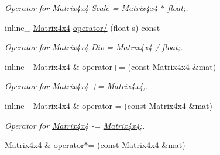 \begin{DoxyCompactItemize}
\begin{DoxyCompactList}\small\item\em Operator for \hyperlink{class_matrix4x4}{Matrix4x4} Scale = \hyperlink{class_matrix4x4}{Matrix4x4} $\ast$ float;. \end{DoxyCompactList}\item 
\hypertarget{class_matrix4x4_a7409459b4e7c25164031148b290ba899}{inline\+\_\+ \hyperlink{class_matrix4x4}{Matrix4x4} \hyperlink{class_matrix4x4_a7409459b4e7c25164031148b290ba899}{operator/} (float s) const }\label{class_matrix4x4_a7409459b4e7c25164031148b290ba899}

\begin{DoxyCompactList}\small\item\em Operator for \hyperlink{class_matrix4x4}{Matrix4x4} Div = \hyperlink{class_matrix4x4}{Matrix4x4} / float;. \end{DoxyCompactList}\item 
\hypertarget{class_matrix4x4_a8646f6d6d1ecfd9d56f2d943056ad80d}{inline\+\_\+ \hyperlink{class_matrix4x4}{Matrix4x4} \& \hyperlink{class_matrix4x4_a8646f6d6d1ecfd9d56f2d943056ad80d}{operator+=} (const \hyperlink{class_matrix4x4}{Matrix4x4} \&mat)}\label{class_matrix4x4_a8646f6d6d1ecfd9d56f2d943056ad80d}

\begin{DoxyCompactList}\small\item\em Operator for \hyperlink{class_matrix4x4}{Matrix4x4} += \hyperlink{class_matrix4x4}{Matrix4x4};. \end{DoxyCompactList}\item 
\hypertarget{class_matrix4x4_a95b6e7baaaa01c70666b11ba30f22dd9}{inline\+\_\+ \hyperlink{class_matrix4x4}{Matrix4x4} \& \hyperlink{class_matrix4x4_a95b6e7baaaa01c70666b11ba30f22dd9}{operator-\/=} (const \hyperlink{class_matrix4x4}{Matrix4x4} \&mat)}\label{class_matrix4x4_a95b6e7baaaa01c70666b11ba30f22dd9}

\begin{DoxyCompactList}\small\item\em Operator for \hyperlink{class_matrix4x4}{Matrix4x4} -\/= \hyperlink{class_matrix4x4}{Matrix4x4};. \end{DoxyCompactList}\item 
\hypertarget{class_matrix4x4_a94fe48c8fe7bc602a382e25c9f80c5cf}{\hyperlink{class_matrix4x4}{Matrix4x4} \& \hyperlink{class_matrix4x4_a94fe48c8fe7bc602a382e25c9f80c5cf}{operator$\ast$=} (const \hyperlink{class_matrix4x4}{Matrix4x4} \&mat)}\label{class_matrix4x4_a94fe48c8fe7bc602a382e25c9f80c5cf}


\end{DoxyCompactItemize}
